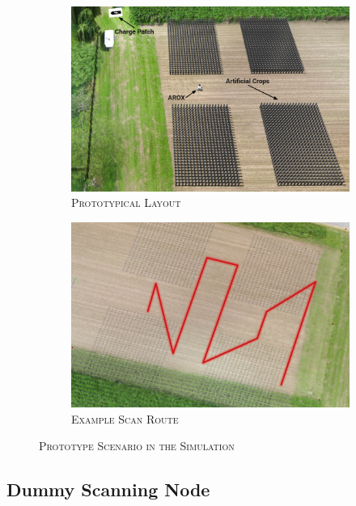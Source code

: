 \documentclass[english, master, utf8]{base/thesis_KBS}
\begin{document}
\begin{figure}[H]
    \centering
    \begin{subfigure}[b]{0.49\textwidth}
        \centering
        \includegraphics[width=\textwidth]{pics/prototype_scenario.jpg}
        \caption{\textsc{Prototypical Layout}}
        \label{fig:prototypical_layout}
    \end{subfigure}
    \hfill
    \begin{subfigure}[b]{0.49\textwidth}
        \centering
        \includegraphics[width=\textwidth]{pics/example_path.png}
        \caption{\textsc{Example Scan Route}}
        \label{fig:example_scan_route}
    \end{subfigure}
\caption{\textsc{Prototype Scenario in the Simulation}}
\label{fig:prototype_sim}
\end{figure}

\subsection{Dummy Scanning Node}
\label{sec:dummy_scanning_node}
\end{document}
